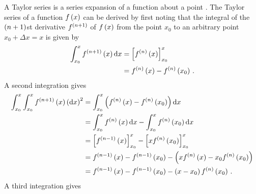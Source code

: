A Taylor series is a series expansion of a function about a point \parencite{Weisstein2017}.
The Taylor series of a function $f\del{ x }$ can be derived by first noting that the integral of the $\del{ n+1 }$st derivative $f^{\del{ n+1 }}$ of $f\del{ x }$ from the point $x_0$ to an arbitrary point $x_0 + \Delta x = x$ is given by
\begin{align*}
  \int_{x_0}^x{f^{\del{ n+1 }}\del{ x }}\dif x &= \sbr{ f^{\del{ n }}\del{ x } }_{x_0}^x \\
                               &= f^{\del{ n }}\del{ x } - f^{\del{ n }}\del{ x_0 } \, .
\end{align*}
A second integration gives
\begin{align*}
  \int_{x_0}^x\int_{x_0}^x{f^{\del{ n+1 }}\del{ x }} \del{ \dif x }^2 &= \int_{x_0}^x{\del{ f^{\del{ n }}\del{ x } - f^{\del{ n }}\del{ x_0 } }}\dif x \\
                                    &= \int_{x_0}^x{f^{\del{ n }}\del{ x }}\dif x - \int_{x_0}^x{f^{\del{ n }}\del{ x_0 }}\dif x \\
                                    &= \sbr{ f^{\del{ n-1 }}\del{ x } }_{x_0}^x - \sbr{ x f^{\del{ n }}\del{ x_0 } }_{x_0}^x \\
                                    &= f^{\del{ n-1 }}\del{ x } - f^{\del{ n-1 }}\del{ x_0 } - \del{ x f^{\del{ n }}\del{ x } - x_0 f^{\del{ n }}\del{ x_0 } } \\
                                    &= f^{\del{ n-1 }}\del{ x } - f^{\del{ n-1 }}\del{ x_0 } - \del{ x - x_0 } f^{\del{ n }}\del{ x_0 } \, .
\end{align*}
A third integration gives
